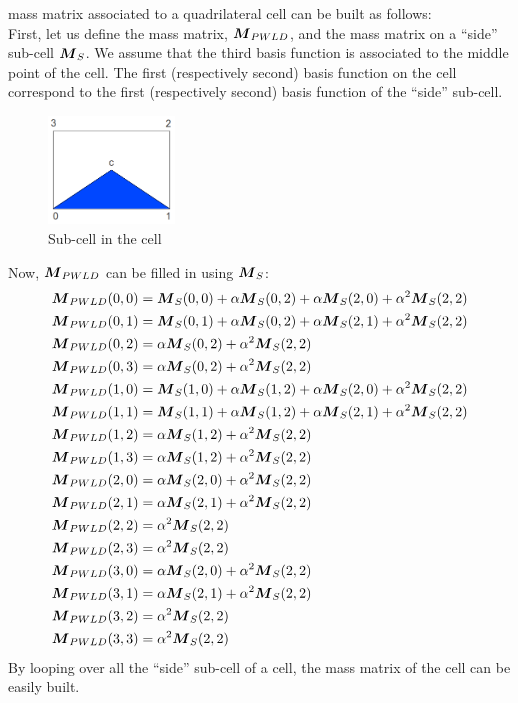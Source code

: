 mass matrix associated to a quadrilateral cell can be built as follows:\\
First, let us define the mass matrix, $\boldsymbol{M}_{PWLD}$, and the mass matrix on a 
``side'' sub-cell $\boldsymbol{M}_S$. We assume that the third basis function is associated 
to the middle point of the cell. The first (respectively second) basis function on 
the cell correspond to the first (respectively second) basis function of the 
``side'' sub-cell.
\begin{figure}[H]
  \centering
  \includegraphics[width=0.3\textwidth]{./Dsa/mass_matrix}
  \caption{Sub-cell in the cell}
\end{figure}
Now, $\boldsymbol{M}_{PWLD}$ can be filled in using $\boldsymbol{M}_S$:
{\allowdisplaybreaks
\begin{align}
  & \boldsymbol{M}_{PWLD}(0,0) =  \boldsymbol{M}_S(0,0) + \alpha \boldsymbol{M}_S(0,2) + \alpha
  \boldsymbol{M}_S(2,0) + \alpha^2 \boldsymbol{M}_S(2,2)\\
  & \boldsymbol{M}_{PWLD}(0,1) =  \boldsymbol{M}_S(0,1) + \alpha \boldsymbol{M}_S(0,2) + \alpha
  \boldsymbol{M}_S(2,1) + \alpha^2 \boldsymbol{M}_S(2,2)\\
  & \boldsymbol{M}_{PWLD}(0,2) =  \alpha \boldsymbol{M}_S(0,2) + \alpha^2 \boldsymbol{M}_S(2,2)\\
  & \boldsymbol{M}_{PWLD}(0,3) =  \alpha \boldsymbol{M}_S(0,2) + \alpha^2 \boldsymbol{M}_S(2,2)\\
  & \boldsymbol{M}_{PWLD}(1,0) =  \boldsymbol{M}_S(1,0) + \alpha \boldsymbol{M}_S(1,2) + \alpha
  \boldsymbol{M}_S(2,0) + \alpha^2 \boldsymbol{M}_S(2,2)\\
  & \boldsymbol{M}_{PWLD}(1,1) =  \boldsymbol{M}_S(1,1) + \alpha \boldsymbol{M}_S(1,2) + \alpha
  \boldsymbol{M}_S(2,1) + \alpha^2 \boldsymbol{M}_S(2,2)\\
  & \boldsymbol{M}_{PWLD}(1,2) =  \alpha \boldsymbol{M}_S(1,2) + \alpha^2 \boldsymbol{M}_S(2,2)\\
  & \boldsymbol{M}_{PWLD}(1,3) =  \alpha \boldsymbol{M}_S(1,2) + \alpha^2 \boldsymbol{M}_S(2,2)\\
  & \boldsymbol{M}_{PWLD}(2,0) =  \alpha \boldsymbol{M}_S(2,0) + \alpha^2 \boldsymbol{M}_S(2,2)\\
  & \boldsymbol{M}_{PWLD}(2,1) =  \alpha \boldsymbol{M}_S(2,1) + \alpha^2 \boldsymbol{M}_S(2,2)\\
  & \boldsymbol{M}_{PWLD}(2,2) =  \alpha^2 \boldsymbol{M}_S(2,2)\\
  & \boldsymbol{M}_{PWLD}(2,3) =  \alpha^2 \boldsymbol{M}_S(2,2)\\
  & \boldsymbol{M}_{PWLD}(3,0) =  \alpha \boldsymbol{M}_S(2,0) + \alpha^2 \boldsymbol{M}_S(2,2)\\
  & \boldsymbol{M}_{PWLD}(3,1) =  \alpha \boldsymbol{M}_S(2,1) + \alpha^2 \boldsymbol{M}_S(2,2)\\
  & \boldsymbol{M}_{PWLD}(3,2) =  \alpha^2 \boldsymbol{M}_S(2,2)\\
  & \boldsymbol{M}_{PWLD}(3,3) =  \alpha^2 \boldsymbol{M}_S(2,2)
\end{align}}    
By looping over all the ``side'' sub-cell of a cell, the mass matrix of the 
cell can be easily built.
